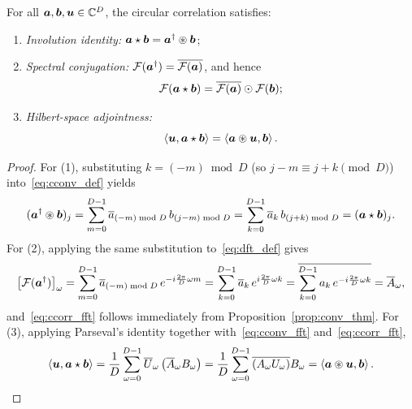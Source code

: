 \begin{lemma}\label{lem:ccorr_props}
For all $\boldsymbol{a}, \boldsymbol{b}, \boldsymbol{u} \in \mathbb{C}^D$, the circular correlation satisfies:
\begin{enumerate}
    \item \emph{Involution identity:} $\boldsymbol{a} \star \boldsymbol{b} = {\boldsymbol{a}}^{\dagger} \circledast \boldsymbol{b}$;
    \item \emph{Spectral conjugation:} $\mathcal{F}({\boldsymbol{a}}^{\dagger}) = \overline{\mathcal{F}(\boldsymbol{a})}$, and hence
    \begin{equation}\label{eq:ccorr_fft}
        \mathcal{F}(\boldsymbol{a} \star \boldsymbol{b}) = \overline{\mathcal{F}(\boldsymbol{a})} \odot \mathcal{F}(\boldsymbol{b});
    \end{equation}
    \item \emph{Hilbert-space adjointness:}
    \begin{equation}\label{eq:adjoint_identity}
        \left\langle \boldsymbol{u}, \boldsymbol{a} \star \boldsymbol{b} \right\rangle = \left\langle \boldsymbol{a} \circledast \boldsymbol{u}, \boldsymbol{b} \right\rangle.
    \end{equation}
\end{enumerate}
\end{lemma}

\begin{proof}
For (1), substituting $k = (-m) \bmod D$ (so $j - m \equiv j + k \pmod D$) into~\eqref{eq:cconv_def} yields
\begin{equation*}
    ({\boldsymbol{a}}^{\dagger} \circledast \boldsymbol{b})_j
    = \sum_{m=0}^{D-1} \overline{a}_{(-m) \bmod D} \, b_{(j - m) \bmod D}
    = \sum_{k=0}^{D-1} \overline{a}_k \, b_{(j + k) \bmod D}
    = (\boldsymbol{a} \star \boldsymbol{b})_j.
\end{equation*}
For (2), applying the same substitution to~\eqref{eq:dft_def} gives
\begin{equation*}
    \big[\mathcal{F}({\boldsymbol{a}}^{\dagger})\big]_\omega
    = \sum_{m=0}^{D-1} \overline{a}_{(-m) \bmod D} \, e^{-i \frac{2\pi}{D}\omega m}
    = \sum_{k=0}^{D-1} \overline{a}_k \, e^{i \frac{2\pi}{D}\omega k}
    = \overline{\sum_{k=0}^{D-1} a_k \, e^{-i \frac{2\pi}{D}\omega k}}
    = \overline{A}_\omega,
\end{equation*}
and~\eqref{eq:ccorr_fft} follows immediately from Proposition~\ref{prop:conv_thm}.
For (3), applying Parseval's identity together with~\eqref{eq:cconv_fft} and~\eqref{eq:ccorr_fft},
\begin{equation*}
    \left\langle \boldsymbol{u}, \boldsymbol{a} \star \boldsymbol{b} \right\rangle
    = \frac{1}{D} \sum_{\omega=0}^{D-1} \overline{U}_\omega \left(\overline{A}_\omega B_\omega\right)
    = \frac{1}{D} \sum_{\omega=0}^{D-1} \overline{\left(A_\omega U_\omega\right)} B_\omega
    = \left\langle \boldsymbol{a} \circledast \boldsymbol{u}, \boldsymbol{b} \right\rangle. \qedhere
\end{equation*}
\end{proof}

